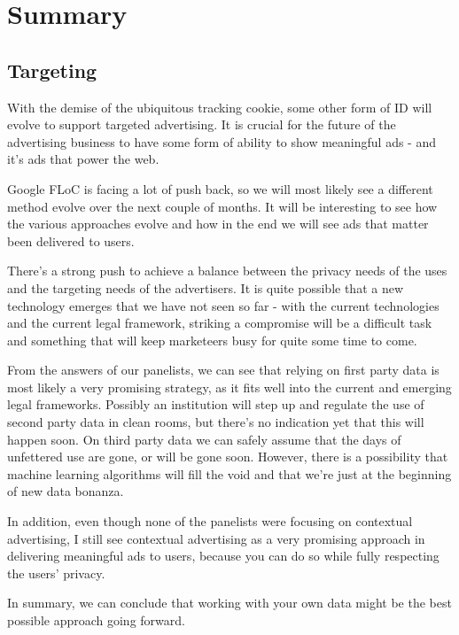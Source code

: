 %
%

\pagebreak
\section{Summary}

\onehalfspacing

\subsection{Targeting}

With the demise of the ubiquitous tracking cookie, some other form of ID will evolve to support targeted advertising. It is crucial for the future of the advertising business to have some form of ability to show meaningful ads - and it's ads that power the web.

Google FLoC is facing a lot of push back, so we will most likely see a different method evolve over the next couple of months. It will be interesting to see how the various approaches evolve and how in the end we will see ads that matter been delivered to users.

There's a strong push to achieve a balance between the privacy needs of the uses and the targeting needs of the advertisers. It is quite possible that a new technology emerges that we have not seen so far - with the current technologies and the current legal framework, striking a compromise will be a difficult task and something that will keep marketeers busy for quite some time to come.

From the answers of our panelists, we can see that relying on first party data is most likely a very promising strategy, as it fits well into the current and emerging legal frameworks. Possibly an institution will step up and regulate the use of second party data in clean rooms, but there's no indication yet that this will happen soon. On third party data we can safely assume that the days of unfettered use are gone, or will be gone soon. However, there is a possibility that machine learning algorithms will fill the void and that we're just at the beginning of new data bonanza.

In addition, even though none of the panelists were focusing on contextual advertising, I still see contextual advertising as a very promising approach in delivering meaningful ads to users, because you can do so while fully respecting the users' privacy.

In summary, we can conclude that working with your own data might be the best possible approach going forward.

